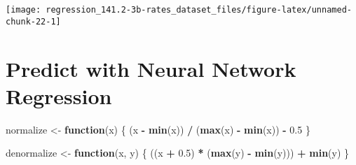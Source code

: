 \documentclass[]{book}
\newenvironment{Shaded}{\begin{snugshade}}{\end{snugshade}}
\newcommand{\CommentTok}[1]{\textcolor[rgb]{0.56,0.35,0.01}{\textit{#1}}}
\newcommand{\ControlFlowTok}[1]{\textcolor[rgb]{0.13,0.29,0.53}{\textbf{#1}}}
\newcommand{\DataTypeTok}[1]{\textcolor[rgb]{0.13,0.29,0.53}{#1}}
\newcommand{\DecValTok}[1]{\textcolor[rgb]{0.00,0.00,0.81}{#1}}
\newcommand{\FloatTok}[1]{\textcolor[rgb]{0.00,0.00,0.81}{#1}}
\newcommand{\KeywordTok}[1]{\textcolor[rgb]{0.13,0.29,0.53}{\textbf{#1}}}
\newcommand{\NormalTok}[1]{#1}
\newcommand{\OperatorTok}[1]{\textcolor[rgb]{0.81,0.36,0.00}{\textbf{#1}}}
\newcommand{\StringTok}[1]{\textcolor[rgb]{0.31,0.60,0.02}{#1}}
\begin{document}
\begin{center}\texttt{[image: regression\_141.2-3b-rates\_dataset\_files/figure-latex/unnamed-chunk-22-1]} \end{center}

\begin{Shaded}
\end{Shaded}

\hypertarget{predict-with-neural-network-regression-1}{%
\section{Predict with Neural Network Regression}\label{predict-with-neural-network-regression-1}}

\begin{Shaded}
\begin{Highlighting}[]
\NormalTok{normalize <-}\StringTok{ }\ControlFlowTok{function}\NormalTok{(x) \{}
\NormalTok{  (x }\OperatorTok{-}\StringTok{ }\KeywordTok{min}\NormalTok{(x)) }\OperatorTok{/}\StringTok{ }\NormalTok{(}\KeywordTok{max}\NormalTok{(x) }\OperatorTok{-}\StringTok{ }\KeywordTok{min}\NormalTok{(x)) }\OperatorTok{-}\StringTok{ }\FloatTok{0.5}
\NormalTok{\}}
\end{Highlighting}
\end{Shaded}

\begin{Shaded}
\begin{Highlighting}[]
\NormalTok{denormalize <-}\StringTok{ }\ControlFlowTok{function}\NormalTok{(x, y) \{}
\NormalTok{  ((x }\OperatorTok{+}\StringTok{ }\FloatTok{0.5}\NormalTok{) }\OperatorTok{*}\StringTok{ }\NormalTok{(}\KeywordTok{max}\NormalTok{(y) }\OperatorTok{-}\StringTok{ }\KeywordTok{min}\NormalTok{(y))) }\OperatorTok{+}\StringTok{ }\KeywordTok{min}\NormalTok{(y)}
\NormalTok{\}}
\end{Highlighting}
\end{Shaded}

\begin{Shaded}
\end{Shaded}
\end{document}
